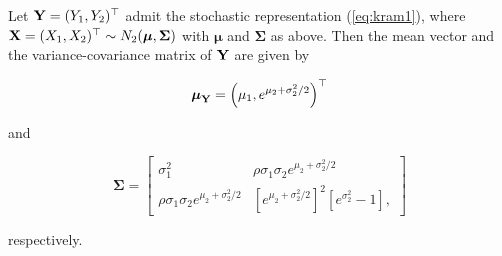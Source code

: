 \documentclass[
]{jss}
\begin{document}
\begin{lemma}
Let ${\bf Y} = (Y_1, Y_2)^\top$ admit the stochastic representation (\ref{eq:kram1}), where ${\bf X} = (X_1, X_2)^\top \sim N_2(\boldsymbol \mu, \boldsymbol \Sigma)$ with $\boldsymbol \mu$ and $\boldsymbol \Sigma$ as above. Then the mean vector and the variance-covariance matrix of ${\bf Y}$ are given by 

\begin{equation}
\label{eq:kram6}
\boldsymbol \mu_{{\bf Y}} = \left(\mu_1, e^{\mu_2+\sigma_2^2/2}\right)^\top
\end{equation}

and 

\begin{equation}
\label{eq:kram7}
\boldsymbol \Sigma = 
\begin{bmatrix}
\sigma_1^2 & \rho \sigma_1\sigma_2  e^{\mu_2+\sigma_2^2/2}  \\
\rho \sigma_1\sigma_2 e^{\mu_2+\sigma_2^2/2} & \left[ e^{\mu_2+\sigma_2^2/2}\right]^2 \left[e^{\sigma_2^2} -1 \right],
\end{bmatrix}
\end{equation}

respectively. 
\end{lemma}
\end{document}
